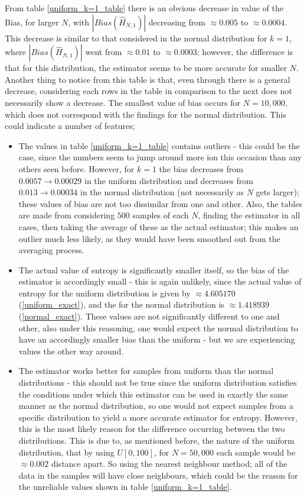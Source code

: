 \documentclass{report}
\begin{document}
From table \ref{uniform_k=1_table} there is an obvious decrease in value of the Bias, for larger $N$, with $|Bias(\hat{H}_{N, 1})|$ decreasing from $\approx 0.005$ to $\approx 0.0004$. This decrease is similar to that considered in the normal distribution for $k=1$, where $|Bias(\hat{H}_{N, 1})|$ went from $\approx 0.01$ to $\approx 0.0003$; however, the difference is that for this distribution, the estimator seems to be more accurate for smaller $N$. Another thing to notice from this table is that, even through there is a general decrease, considering each rows in the table in comparison to the next does not necessarily show a decrease. The smallest value of bias occurs for $N=10,000$, which does not correspond with the findings for the normal distribution. This could indicate a number of features;

\begin{itemize}
\item The values in table \ref{uniform_k=1_table} contains outliers - this could be the case, since the numbers seem to jump around more ion this occasion than any others seen before. However, for $k=1$ the bias decreases from $0.0057 \to 0.00029$ in the uniform distribution and decreases from $0.013 \to 0.00034$ in the normal distribution (not necessarily as $N$ gets larger); these values of bias are not too dissimilar from one and other. Also, the tables are made from considering $500$ samples of each $N$, finding the estimator in all cases, then taking the average of these as the actual estimator; this makes an outlier much less likely, as they would have been smoothed out from the averaging process.

\item The actual value of entropy is significantly smaller itself, so the bias of the estimator is accordingly small - this is again unlikely, since the actual value of entropy for the uniform distribution is given by $\approx 4.605170$ (\ref{uniform_exact}), and the for the normal distribution is $\approx 1.418939$ (\ref{normal_exact}). These values are not significantly different to one and other, also under this reasoning, one would expect the normal distribution to have an accordingly smaller bias than the uniform - but we are experiencing values the other way around.

\item The estimator works better for samples from uniform than the normal distributions - this should not be true since the uniform distribution satisfies the conditions under which this estimator can be used in exactly the same manner as the normal distribution, so one would not expect samples from a specific distribution to yield a more accurate estimator for entropy. However, this is the most likely reason for the difference occurring between the two distributions. This is due to, as mentioned before, the nature of the uniform distribution, that by using $U[0, 100]$, for $N=50,000$ each sample would be $\approx 0.002$ distance apart. So using the nearest neighbour method; all of the data in the samples will have close neighbours, which could be the reason for the unreliable values shown in table \ref{uniform_k=1_table}.
\end{itemize}
\end{document}
